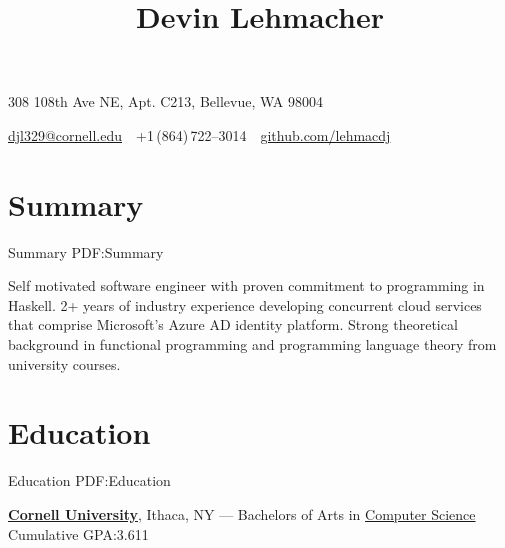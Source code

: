 \documentclass[letterpaper,10pt,oneside]{simpleresume}
\makeatletter
\newcommand{\CVAuthor}{Devin Lehmacher}
\newcommand{\CVWebpage}{github.com/lehmacdj}
\newcommand{\CVMailAddress}{djl329@cornell.edu}
\makeatother
\begin{document}
\begin{minipage}[t][0pt]{\linewidth}
\pagestyle{empty}

\title{\CVAuthor}

\begin{subtitle}
308 108th Ave NE, Apt. C213, Bellevue, WA 98004
\par
\href{mailto:\CVMailAddress}
{\CVMailAddress}
\,\SubBulletSymbol\,
+1\,(864)\,722--3014
\,\SubBulletSymbol\,
\href{https://\CVWebpage}
{\CVWebpage}
\end{subtitle}

\begin{body}

\section%
{Summary}
{Summary}
{PDF:Summary}

Self motivated software engineer with proven commitment to programming in
Haskell. 2+ years of industry experience developing concurrent cloud services
that comprise Microsoft's Azure AD identity platform. Strong theoretical
background in functional programming and programming language theory from
university courses.

\section%
{Education}
{Education}
{PDF:Education}

\href{https://www.cornell.edu}
{\textbf{Cornell University}}, Ithaca, NY
\hfill
{} ---
\BulletItem%
Bachelors of Arts in
\href{https://www.cs.cornell.edu}{Computer Science}
\BulletItem%
Cumulative GPA:\@ 3.611

\end{body}
\end{minipage}
\end{document}
